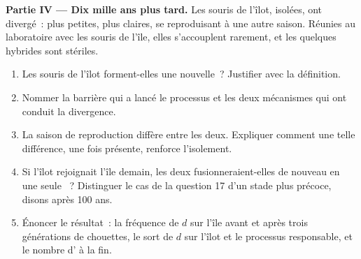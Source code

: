 \begin{problem}
\medskip
\noindent\textbf{Partie IV --- Dix mille ans plus tard.}
Les souris de l'îlot, isolées, ont divergé~: plus petites, plus claires,
se reproduisant à une autre saison. Réunies au laboratoire avec les
souris de l'île, elles s'accouplent rarement, et les quelques hybrides
sont stériles.
\begin{enumerate}[resume]
  \item Les souris de l'îlot forment-elles une  nouvelle~?
        Justifier avec la définition.
  \item Nommer la barrière qui a lancé le processus et les deux
        mécanismes qui ont conduit la divergence.
  \item La saison de reproduction diffère entre les deux. Expliquer
        comment une telle différence, une fois présente, renforce
        l'isolement.
  \item Si l'îlot rejoignait l'île demain, les deux fusionneraient-elles
        de nouveau en une seule ~? Distinguer le cas de la
        question 17 d'un stade plus précoce, disons après 100 ans.
  \item Énoncer le résultat~: la fréquence de $d$ sur l'île avant et
        après trois générations de chouettes, le sort de $d$ sur l'îlot
        et le processus responsable, et le nombre d' à la fin.
\end{enumerate}
\end{problem}
